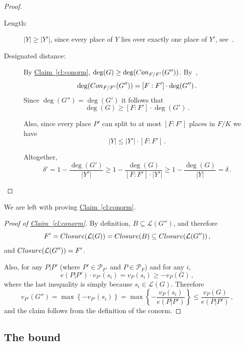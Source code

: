 \documentclass[10pt]{article}
\theoremstyle{definition}
\numberwithin{equation}{section}
\newcommand{\expref}[2]{\texorpdfstring{\hyperref[#2]{#1~\ref{#2}}}{#1~\ref{#2}}}
\newcommand{\cL}{\mathcal{L}}
\newcommand{\cP}{\mathcal{P}}
\newcommand{\set}[1]{{\left\{#1\right\}}}
\newcommand{\closure}{{\rm Closure}}
\newcommand{\con}{{\rm Con}}
\begin{document}
\begin{proof}
\begin{description}
\item [Length:] $|Y| \ge |Y'|$, since every place of $Y$ lies over exactly one place of $Y'$,
see~\cite[Proposition III.1.7]{S:93}.

\item [Designated distance:]
By \expref{Claim}{cl:conorm}, $\deg(G) \ge \deg( \con_{F/F'}(G''))$. By~\cite[Cor III.1.13]{S:93},
$$\deg(\con_{F/F'}(G''))=[F:F'] \cdot \deg(G'')\,.$$ Since
$\deg(G'')=\deg(G')$ it follows that $$\deg(G) \ge [F:F'] \cdot
\deg(G')\,.$$

Also, since every place $P'$ can split to at most $[F:F']$ places in
$F/K$ we have $$|Y| \le |Y'| \cdot [F:F']\,.$$

Altogether,
$$\delta' = 1 - \frac{\deg(G')}{|Y'|}
\ge  1 - \frac{\deg(G)}{[F:F'] \cdot |Y'|} \ge 1 -
\frac{\deg(G)}{|Y|} = \delta\,.$$
\end{description}
\end{proof}

We are left with proving \expref{Claim}{cl:conorm}.

\begin{proof}[Proof of \expref{Claim}{cl:conorm}]
 By definition, $B \subseteq \cL(G'')$, and therefore
$$F' = \closure(\cL(G)) = \closure(B) \subseteq \closure(\cL(G''))\,,$$
and $\closure(\cL(G''))=F'$.

Also, for any $P|P'$ (where  $P' \in \cP_{F'}$ and $P \in \cP_F$)
and for any $i$, $$e(P|P') \cdot v_{P'}(s_i) = v_{P}(s_i) \ge
-v_{P}(G)\,,$$ where the last inequality is simply because $s_i \in
\cL(G)$. Therefore
$$v_{P'}(G'') = \max \set{-v_{P'}(s_i)} =
\max \set{- \frac{v_{P}(s_i)}{e(P|P')}} \le
\frac{v_{P}(G)}{e(P|P')}\,,$$ and the claim follows from the definition
of the conorm.
\end{proof}

\subsection{The bound}
\end{document}
